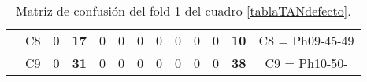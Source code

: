 \begin{table}[H]
{\begin{tabular}{|ccrrrrrrrrrrc|}
\multicolumn{1}{|c|}{}                                      & \multicolumn{1}{c|}{C8} & \multicolumn{1}{c|}{0}  & \multicolumn{1}{c|}{\textbf{17}} & \multicolumn{1}{c|}{0}  & \multicolumn{1}{c|}{0}  & \multicolumn{1}{c|}{0}  & \multicolumn{1}{c|}{0}  & \multicolumn{1}{c|}{0}  & \multicolumn{1}{c|}{0}  & \multicolumn{1}{c|}{0}  & \multicolumn{1}{c|}{\textbf{10}} & C8 = Ph09-45-49   \\ \cline{2-13}
\multicolumn{1}{|c|}{}                                      & \multicolumn{1}{c|}{C9} & \multicolumn{1}{c|}{0}  & \multicolumn{1}{c|}{\textbf{31}} & \multicolumn{1}{c|}{0}  & \multicolumn{1}{c|}{0}  & \multicolumn{1}{c|}{0}  & \multicolumn{1}{c|}{0}  & \multicolumn{1}{c|}{0}  & \multicolumn{1}{c|}{0}  & \multicolumn{1}{c|}{0}  & \multicolumn{1}{c|}{\textbf{38}} & C9 = Ph10-50-     \\ \hline
\end{tabular}%
}
\caption{Matriz de confusión del fold 1 del cuadro \ref{tablaTANdefecto}.}
\end{table}

